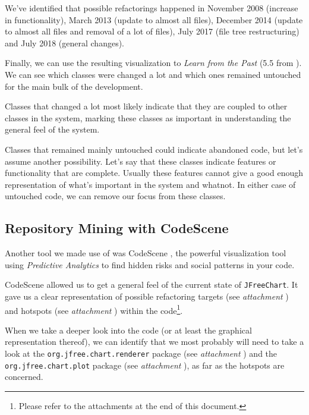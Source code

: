 \documentclass[11pt]{article}
\begin{document}
	We've identified that possible refactorings happened in November 2008 (increase in functionality), March 2013 (update to almost all files), December 2014 (update to almost all files and removal of a lot of files), July 2017 (file tree restructuring) and July 2018 (general changes).
	
	Finally, we can use the resulting visualization to \textsl{Learn from the Past} (5.5 from \cite{demeyer2009object}). We can see which classes were changed a lot and which ones remained untouched for the main bulk of the development.
	
	Classes that changed a lot most likely indicate that they are coupled to other classes in the system, marking these classes as important in understanding the general feel of the system.
	
	Classes that remained mainly untouched could indicate abandoned code, but let's assume another possibility. Let's say that these classes indicate features or functionality that are complete. Usually these features cannot give a good enough representation of what's important in the system and whatnot. In either case of untouched code, we can remove our focus from these classes.
	
	\subsection{Repository Mining with CodeScene}
	\label{sec:codescene}
	Another tool we made use of was \textsf{CodeScene} \cite{codescene}, the powerful visualization tool using \textit{Predictive Analytics} to find hidden risks and social patterns in your code.
	
	\textsf{CodeScene} allowed us to get a general feel of the current state of \texttt{JFreeChart}. It gave us a clear representation of possible refactoring targets (see \textsl{attachment \pageref{refactoring-overview}}) and hotspots (see \textsl{attachment \pageref{hotspots-overview}}) within the code\footnote{Please refer to the attachments at the end of this document.}.
	
	When we take a deeper look into the code (or at least the graphical representation thereof), we can identify that we most probably will need to take a look at the \texttt{org.jfree.chart.renderer} package (see \textsl{attachment \pageref{hotspots-package-renderer}}) and the \texttt{org.jfree.chart.plot} package (see \textsl{attachment \pageref{hotspots-package-plot}}), as far as the hotspots are concerned.
	
\end{document}
